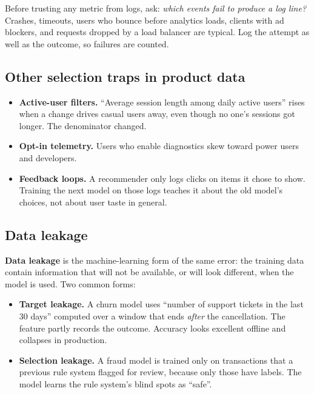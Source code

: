 \begin{trapbox}
Before trusting any metric from logs, ask: \emph{which events fail to produce a log
line?} Crashes, timeouts, users who bounce before analytics loads, clients with ad
blockers, and requests dropped by a load balancer are typical. Log the attempt as well
as the outcome, so failures are counted.
\end{trapbox}

\subsection{Other selection traps in product data}

\begin{itemize}
  \item \textbf{Active-user filters.} ``Average session length among daily active
  users'' rises when a change drives casual users away, even though no one's sessions
  got longer. The denominator changed.
  \item \textbf{Opt-in telemetry.} Users who enable diagnostics skew toward power users
  and developers.
  \item \textbf{Feedback loops.} A recommender only logs clicks on items it chose to
  show. Training the next model on those logs teaches it about the old model's choices,
  not about user taste in general.
\end{itemize}

\subsection{Data leakage}

\textbf{Data leakage} is the machine-learning form of the same error: the training data
contain information that will not be available, or will look different, when the model
is used. Two common forms:
\begin{itemize}
  \item \textbf{Target leakage.} A churn model uses ``number of support tickets in the
  last 30 days'' computed over a window that ends \emph{after} the cancellation. The
  feature partly records the outcome. Accuracy looks excellent offline and collapses in
  production.
  \item \textbf{Selection leakage.} A fraud model is trained only on transactions that
  a previous rule system flagged for review, because only those have labels. The model
  learns the rule system's blind spots as ``safe''.
\end{itemize}

